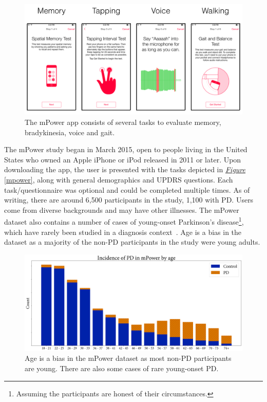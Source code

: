 \documentclass[12pt, twoside]{book}
\begin{document}
\begin{figure}[!htb]
\label{mpowerapp}
\centering\includegraphics[width=1\linewidth]{mpower.png}
\caption{The mPower app consists of several tasks to evaluate memory, bradykinesia, voice and gait. }
\end{figure}

The mPower study began in March 2015, open to people living in the United States who owned an Apple iPhone or iPod released in 2011 or later. Upon downloading the app, the user is presented with the tasks depicted in \textit{\hyperref[mpower]{Figure}} \ref{mpower}, along with general demographics and UPDRS questions. Each task/questionnaire was optional and could be completed multiple times. As of writing, there are around 6,500 participants in the study, 1,100 with PD. Users come from diverse backgrounds and may have other illnesses. The mPower dataset also contains a number of cases of young-onset Parkinson's disease\footnote{Assuming the participants are honest of their circumstances.}, which have rarely been studied in a diagnosis context~\cite{youngpd1, youngpd2}. Age is a bias in the dataset as a majority of the non-PD participants in the study were young adults. %

\addtocounter{footnote}{-1}
\begin{figure}[!htb]
\label{mpowerage}
\centering\includegraphics[width=1\linewidth]{mpowerage.png}
\caption{Age is a bias in the mPower dataset as most non-PD participants are young. There are also some cases of rare young-onset PD\protect\footnotemark.}
\end{figure}
\end{document}
